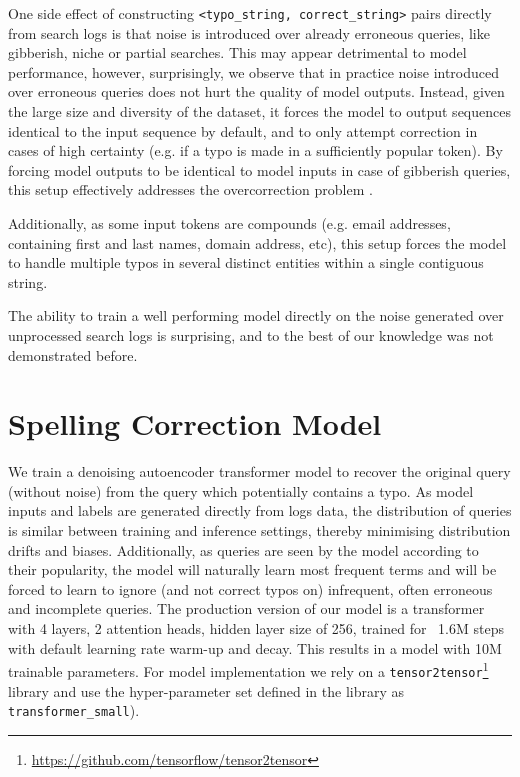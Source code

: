 \documentclass[11pt,a4paper]{article}
\begin{document}
One side effect of constructing \texttt{<typo\_string, correct\_string>} pairs directly from search logs is that noise is introduced over already erroneous queries, like gibberish, niche or partial searches. This may appear detrimental to model performance, however, surprisingly, we observe that in practice noise introduced over erroneous queries does not hurt the quality of model outputs. Instead, given the large size and diversity of the dataset, it forces the model to output sequences identical to the input sequence by default, and to only attempt correction in cases of high certainty (e.g. if a typo is made in a sufficiently popular token). By forcing model outputs to be identical to model inputs in case of gibberish queries, this setup effectively addresses the overcorrection problem \cite{movin2018spelling,Zhu2019}.

Additionally, as some input tokens are compounds (e.g. email addresses, containing first and last names, domain address, etc), this setup forces the model to handle multiple typos in several distinct entities within a single contiguous string.

The ability to train a well performing model directly on the noise generated over unprocessed search logs is surprising, and to the best of our knowledge was not demonstrated before.


\section{Spelling Correction Model \label{sec:spelling_correction_model}}

We train a denoising autoencoder transformer model to recover the original query (without noise) from the query which potentially contains a typo. As model inputs and labels are generated directly from logs data, the distribution of queries is similar between training and inference settings, thereby minimising distribution drifts and biases. Additionally, as queries are seen by the model according to their popularity, the model will naturally learn most frequent terms and will be forced to learn to ignore (and not correct typos on) infrequent, often erroneous and incomplete queries. The production version of our model is a transformer with 4 layers, 2 attention heads, hidden layer size of 256, trained for ~1.6M steps with default learning rate warm-up and decay. This results in a model with 10M trainable parameters. For model implementation we rely on a \texttt{tensor2tensor}\footnote{\url{https://github.com/tensorflow/tensor2tensor}} library \cite{tensor2tensor} and use the hyper-parameter set defined
in the library as \texttt{transformer\_small}).
\end{document}
